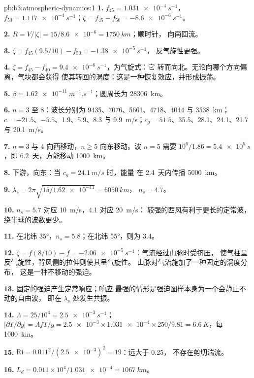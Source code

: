 \begin{solution}{pb:b3:atmospheric-dynamics:1}
\textbf{1.} $f_{45} = \qty{1.031e-4}{s^{-1}}$，$f_{50} =
\qty{1.117e-4}{s^{-1}}$；$\zeta = f_{45} - f_{50} = \qty{-8.6e-6}{s^{-1}}$。

\textbf{2.} $R = V/|\zeta| = 15/\num{8.6e-6} = \qty{1750}{km}$；顺时针，
向南回流。

\textbf{3.} $\zeta = f_{45}(9.5/10) - f_{50} = \qty{-1.38e-5}{s^{-1}}$，
反气旋性更强。

\textbf{4.} $\zeta = f_{45} - f_{40} = \qty{+9.4e-6}{s^{-1}}$，为气旋式：它
转而向北。无论向哪个方向偏离，气块都会获得
使其转回的涡度：这是一种恢复效应，并形成振荡。

\textbf{5.} $\beta = \qty{1.62e-11}{m^{-1}.s^{-1}}$；圆周长为
\qty{28306}{km}。

\textbf{6.} $n = 3$ 至 8：波长分别为 9435、7076、5661、4718、4044 与
\qty{3538}{km}；$c = -21.5$、$-5.5$、1.9、5.9、8.3 与 \qty{9.9}{m/s}；$c_g
= 51.5$、35.5、28.1、24.1、21.7 与 \qty{20.1}{m/s}。

\textbf{7.} $n = 3$ 与 4 向西移动，$n \ge 5$ 向东移动。波 $n = 5$ 需要
$10^6/1.86 = \qty{5.4e5}{s}$，即 \num{6.2}~天，方能移动 \qty{1000}{km}。

\textbf{8.} 下游，向东：当 $c_g = \qty{24.1}{m/s}$ 时，能量
在 \num{2.4}~天内传播 \qty{5000}{km}。

\textbf{9.} $\lambda_s = 2\pi\sqrt{15/\num{1.62e-11}} = \qty{6050}{km}$，
$n_s = 4.7$。

\textbf{10.} $n_s = 5.7$ 对应 \qty{10}{m/s}，4.1 对应 \qty{20}{m/s}：
较强的西风有利于更长的定常波，
绕半球的波数更少。

\textbf{11.} 在北纬 \ang{35}，$n_s = 5.8$；在北纬 \ang{55}，则为 3.4。

\textbf{12.} $\zeta = f(8/10) - f = \qty{-2.06e-5}{s^{-1}}$：气流经过山脉时受挤压，
使气柱呈反气旋性，背风侧的拉伸则使其呈气旋性。
山脉对气流施加了一种固定的涡度分布，
这是一种不移动的强迫。

\textbf{13.} 固定的强迫产生定常响应；响应
最强的情形是强迫图样本身为一个会静止不动的自由波，
即在 $\lambda_s$ 处发生共振。

\textbf{14.} $\Lambda = 25/10^4 = \qty{2.5e-3}{s^{-1}}$；
$|\partial T/\partial y| = \Lambda fT/g = \num{2.5e-3}\times\num{1.031e-4}
\times250/9.81 = \qty{6.6}{K}$，每 \qty{1000}{km}。

\textbf{15.} $\mathrm{Ri} = 0.011^2/(\num{2.5e-3})^2 = 19$：远大于 0.25，
不存在剪切湍流。

\textbf{16.} $L_d = 0.011\times10^4/\num{1.031e-4} = \qty{1067}{km}$。


\end{solution}
